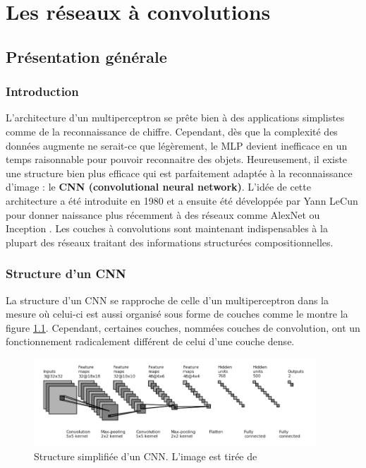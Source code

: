 

\chapter{Les réseaux à convolutions}


\section{Présentation générale}

\subsection{Introduction}
L'architecture d'un multiperceptron se prête bien à des applications simplistes comme de la reconnaissance de chiffre. Cependant, dès que la complexité des données augmente ne serait-ce que légèrement, le MLP devient inefficace en un temps raisonnable pour pouvoir reconnaitre des objets. Heureusement, il existe une structure bien plus efficace qui est parfaitement adaptée à la reconnaissance d'image : le \textbf{CNN (convolutional neural network)}. L'idée de cette architecture a été introduite en 1980 \cite{fukushima_neocognitron_1980} et a ensuite été développée par Yann LeCun \cite{lecun_gradient-based_1998} pour donner naissance plus récemment à des réseaux comme AlexNet \cite{krizhevsky_imagenet_2012} ou Inception \cite{szegedy_going_2014}. Les couches à convolutions sont maintenant indispensables à la plupart des réseaux traitant des informations structurées compositionnelles.

\subsection{Structure d'un CNN}
La structure d'un CNN se rapproche de celle d'un multiperceptron dans la mesure où celui-ci est aussi organisé sous forme de couches comme le montre la figure \ref{structure_1}. Cependant, certaines couches, nommées couches de convolution, ont un fonctionnement radicalement différent de celui d'une couche dense. \\

\begin{figure}[!h]
\centering
\includegraphics[width=300pt]{images/cnn/structure_CNN.png} 
\caption{Structure simplifiée d'un CNN. L'image est tirée de \cite{jefkine_backpropagation_2016} }
\label{structure_1}
\end{figure}

